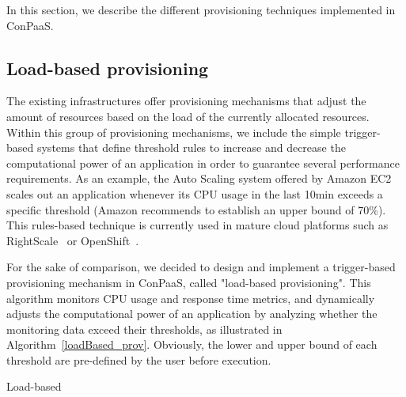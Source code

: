 In this section, we describe the different provisioning techniques implemented in ConPaaS.



\subsection{Load-based provisioning}


The existing infrastructures offer provisioning mechanisms that adjust the amount of resources based on the load of the currently allocated resources. Within this group of provisioning mechanisms, we include the simple trigger-based systems that define threshold rules to increase and decrease the computational power of an application in order to guarantee several performance requirements. As an example, the Auto Scaling system offered by Amazon EC2~\cite{amazonEC2} scales out an application whenever its CPU usage in the last 10min exceeds a specific threshold (Amazon recommends to establish an upper bound of 70\%).  This rules-based technique is currently used in mature cloud platforms such as RightScale~\cite{right-scale} or OpenShift~\cite{openshift}. 

For the sake of comparison, we decided to design and implement a trigger-based provisioning mechanism in ConPaaS, called "load-based provisioning". This algorithm monitors CPU usage and response time metrics, and dynamically adjusts the computational power of an application by analyzing whether the monitoring data exceed their thresholds, as illustrated in Algorithm~\ref{loadBased_prov}. Obviously, the lower and upper bound of each threshold are pre-defined by the user before execution.

\begin{algorithm}
{\scriptsize
\SetAlgoLined
\SetInd{0mm}{2mm}
\BlankLine
{}
}
\caption{Load-based}
\label{loadBased_prov}
\end{algorithm}

